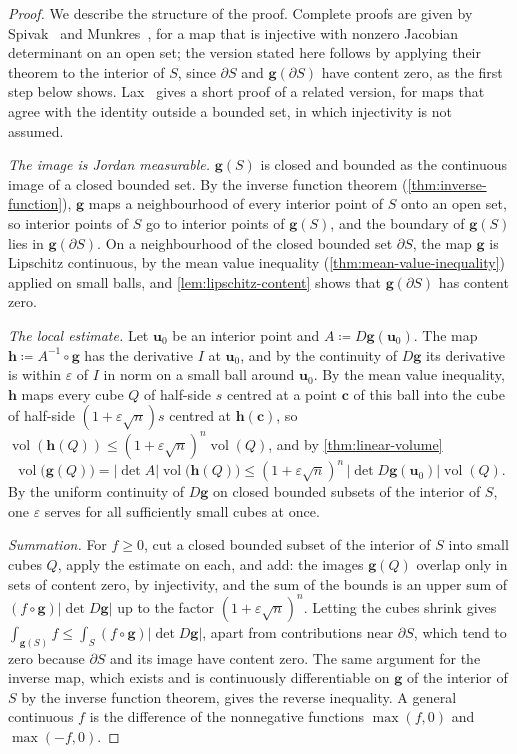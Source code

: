 \begin{proof}
We describe the structure of the proof. Complete proofs are given by Spivak~\cite[Thm.~3-13]{spivak1965manifolds} and Munkres~\cite[Chap.~4]{munkres1991}, for a map that is injective with nonzero Jacobian determinant on an open set; the version stated here follows by applying their theorem to the interior of $S$, since $\partial S$ and $\mathbf g(\partial S)$ have content zero, as the first step below shows. Lax~\cite{lax1999} gives a short proof of a related version, for maps that agree with the identity outside a bounded set, in which injectivity is not assumed.

\emph{The image is Jordan measurable.} $\mathbf g(S)$ is closed and bounded as the continuous image of a closed bounded set. By the inverse function theorem (\cref{thm:inverse-function}), $\mathbf g$ maps a neighbourhood of every interior point of $S$ onto an open set, so interior points of $S$ go to interior points of $\mathbf g(S)$, and the boundary of $\mathbf g(S)$ lies in $\mathbf g(\partial S)$. On a neighbourhood of the closed bounded set $\partial S$, the map $\mathbf g$ is Lipschitz continuous, by the mean value inequality (\cref{thm:mean-value-inequality}) applied on small balls, and \cref{lem:lipschitz-content} shows that $\mathbf g(\partial S)$ has content zero.

\emph{The local estimate.} Let $\mathbf u_0$ be an interior point and $A\coloneqq D\mathbf g(\mathbf u_0)$. The map $\mathbf h\coloneqq A^{-1}\circ\mathbf g$ has the derivative $I$ at $\mathbf u_0$, and by the continuity of $D\mathbf g$ its derivative is within $\varepsilon$ of $I$ in norm on a small ball around $\mathbf u_0$. By the mean value inequality, $\mathbf h$ maps every cube $Q$ of half-side $s$ centred at a point $\mathbf c$ of this ball into the cube of half-side $(1+\varepsilon\sqrt n)s$ centred at $\mathbf h(\mathbf c)$, so $\operatorname{vol}(\mathbf h(Q))\le(1+\varepsilon\sqrt n)^n\operatorname{vol}(Q)$, and by \cref{thm:linear-volume}
\[
\operatorname{vol}\bigl(\mathbf g(Q)\bigr)=|\det A|\operatorname{vol}\bigl(\mathbf h(Q)\bigr)\le(1+\varepsilon\sqrt n)^n\,|\det D\mathbf g(\mathbf u_0)|\operatorname{vol}(Q).
\]
By the uniform continuity of $D\mathbf g$ on closed bounded subsets of the interior of $S$, one $\varepsilon$ serves for all sufficiently small cubes at once.

\emph{Summation.} For $f\ge0$, cut a closed bounded subset of the interior of $S$ into small cubes $Q$, apply the estimate on each, and add: the images $\mathbf g(Q)$ overlap only in sets of content zero, by injectivity, and the sum of the bounds is an upper sum of $(f\circ\mathbf g)|\det D\mathbf g|$ up to the factor $(1+\varepsilon\sqrt n)^n$. Letting the cubes shrink gives $\int_{\mathbf g(S)}f\le\int_S(f\circ\mathbf g)|\det D\mathbf g|$, apart from contributions near $\partial S$, which tend to zero because $\partial S$ and its image have content zero. The same argument for the inverse map, which exists and is continuously differentiable on $\mathbf g$ of the interior of $S$ by the inverse function theorem, gives the reverse inequality. A general continuous $f$ is the difference of the nonnegative functions $\max(f,0)$ and $\max(-f,0)$.
\end{proof}

